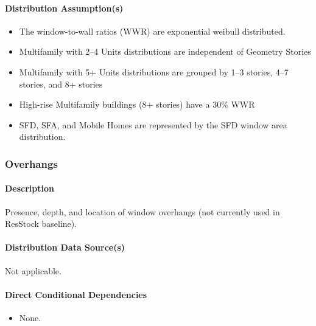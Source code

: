 \paragraph{Distribution Assumption(s)}
\begin{itemize}
 
\item
  The window-to-wall ratios (WWR) are exponential weibull distributed.
\item
  Multifamily with 2--4 Units distributions are independent of Geometry
  Stories
\item
  Multifamily with 5+ Units distributions are grouped by 1--3 stories,
  4--7 stories, and 8+ stories
\item
  High-rise Multifamily buildings (8+ stories) have a 30\% WWR
\item
  SFD, SFA, and Mobile Homes are represented by the SFD window area
  distribution.
\end{itemize}
\subsubsection{Overhangs}\label{overhangs}
\paragraph{Description}
Presence, depth, and location of window overhangs (not currently used in ResStock baseline).
\paragraph{Distribution Data Source(s)}
Not applicable.
\paragraph{Direct Conditional Dependencies}

\begin{itemize}
    \item None.
\end{itemize}
